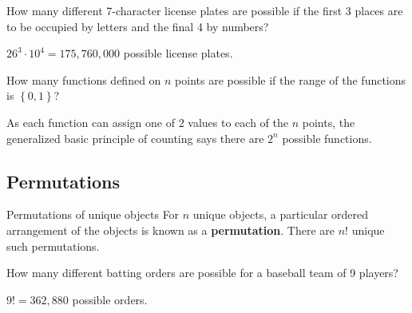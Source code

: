 \begin{changebar}
    \begin{example}
        How many different 7-character license plates are possible if the first 3 places are to be occupied by letters and the final 4 by numbers?
    \end{example}
    \begin{solution}
        $26^3 \cdot 10^4 = 175{,}760{,}000$ possible license plates.
    \end{solution}
\end{changebar}

\begin{changebar}
    \begin{example}\label{funccex}
        How many functions defined on $n$ points are possible if the range of the functions is $\left\{ 0, 1 \right\}$? 
    \end{example}
    \begin{solution}
        As each function can assign one of $2$ values to each of the $n$ points, the generalized basic principle of counting says there are $2^n$ possible functions.
    \end{solution}
\end{changebar}

\pagebreak

\subsection{Permutations}
\begin{bdef}{Permutations of unique objects}
    For $n$ unique objects, a particular ordered arrangement of the objects is known as a \textbf{permutation}. There are $n!$ unique such permutations.
\end{bdef}

\begin{changebar}
    \begin{example}
        How many different batting orders are possible for a baseball team of 9 players?
    \end{example}
    \begin{solution}
        $9! = 362{,}880$ possible orders.
    \end{solution}
\end{changebar}

